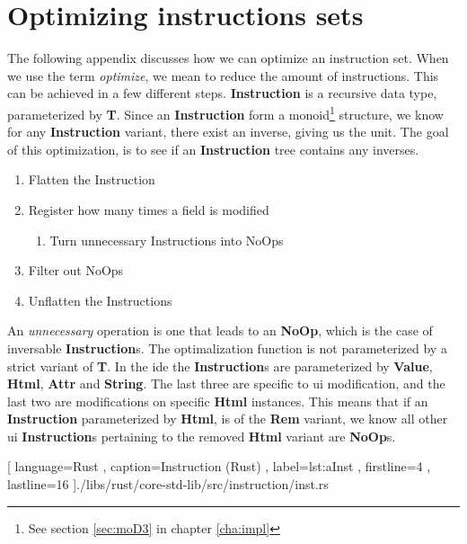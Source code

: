 \chapter{Optimizing instructions sets} \label{app:a}

The following appendix discusses how we can optimize an instruction set. When we
use the term \textit{optimize}, we mean to reduce the amount of instructions.
This can be achieved in a few different steps. \textbf{Instruction} is a
recursive data type, parameterized by \textbf{T}. Since an \textbf{Instruction}
form a monoid\footnote{See section \ref{sec:moD3} in chapter \ref{cha:impl}}
structure, we know for any \textbf{Instruction} variant, there exist an inverse,
giving us the unit. The goal of this optimization, is to see if an
\textbf{Instruction} tree contains any inverses.

\begin{enumerate}
  \item Flatten the Instruction
  \item Register how many times a field is modified
    \begin{enumerate}
      \item Turn unnecessary Instructions into NoOps
    \end{enumerate}
  \item Filter out NoOps
  \item Unflatten the Instructions
\end{enumerate}

An \textit{unnecessary} operation is one that leads to an \textbf{NoOp}, which
is the case of inversable \textbf{Instruction}s. The optimalization function
is not parameterized by a strict variant of \textbf{T}. In the \gls*{ide} the
\textbf{Instruction}s are parameterized by \textbf{Value}, \textbf{Html},
\textbf{Attr} and \textbf{String}. The last three are specific to \gls*{ui}
modification, and the last two are modifications on specific \textbf{Html}
instances. This means that if an \textbf{Instruction} parameterized by
\textbf{Html}, is of the \textbf{Rem} variant, we know all other \gls*{ui}
\textbf{Instruction}s pertaining to the removed \textbf{Html} variant are
\textbf{NoOp}s.

\begin{code}[H]
  
   [ language=Rust
   , caption={Instruction (Rust)}
   , label=lst:aInst
   , firstline=4
   , lastline=16
   ]{./libs/rust/core-std-lib/src/instruction/inst.rs}
\end{code}

